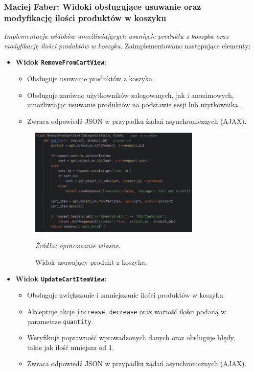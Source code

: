 \documentclass[12pt,a4paper,oneside]{article}
\theoremstyle{definition}
\numberwithin{equation}{section}
\begin{document}
\subsubsection{Maciej Faber: Widoki obsługujące usuwanie oraz modyfikację ilości produktów w koszyku}
\label{section:1.3.40}
\textit{
Implementacja widoków umożliwiających usunięcie produktu z koszyka oraz modyfikację ilości produktów w koszyku.
}
Zaimplementowano następujące elementy:
\begin{itemize}
    \item \textbf{Widok \texttt{RemoveFromCartView}:}
    \begin{itemize}
        \item Obsługuje usuwanie produktów z koszyka.
        \item Obsługuje zarówno użytkowników zalogowanych, jak i anonimowych,\\ umożliwiając usuwanie produktów na podstawie sesji lub użytkownika.
        \item Zwraca odpowiedź JSON w przypadku żądań asynchronicznych (AJAX).
    \end{itemize}
    \begin{figure}[H]
        \centering
        \includegraphics[width=0.8\textwidth]{images/krzysztofBImages/remove_from_cart_view.png}
        \caption{Widok usuwający produkt z koszyka.}
        \emph{Źródło: opracowanie własne.}
        \label{fig:remove_item_cart}
    \end{figure}
    \item \textbf{Widok \texttt{UpdateCartItemView}:}
    \begin{itemize}
        \item Obsługuje zwiększanie i zmniejszanie ilości produktów w koszyku.
        \item Akceptuje akcje \texttt{increase}, \texttt{decrease} oraz wartość ilości podaną w parametrze \texttt{quantity}.
        \item Weryfikuje poprawność wprowadzonych danych oraz obsługuje błędy, takie jak ilość mniejsza od 1.
        \item Zwraca odpowiedź JSON w przypadku żądań asynchronicznych (AJAX).
    \end{itemize}
\end{itemize}
\end{document}
